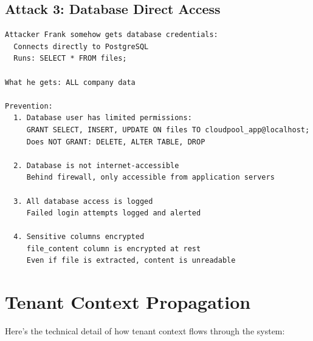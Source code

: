 \documentclass[11pt,a4paper]{report}
\begin{document}
\section{Attack 3: Database Direct Access}


\begin{lstlisting}[language=text]
Attacker Frank somehow gets database credentials:
  Connects directly to PostgreSQL
  Runs: SELECT * FROM files;

What he gets: ALL company data

Prevention:
  1. Database user has limited permissions:
     GRANT SELECT, INSERT, UPDATE ON files TO cloudpool_app@localhost;
     Does NOT GRANT: DELETE, ALTER TABLE, DROP
  
  2. Database is not internet-accessible
     Behind firewall, only accessible from application servers
  
  3. All database access is logged
     Failed login attempts logged and alerted
  
  4. Sensitive columns encrypted
     file_content column is encrypted at rest
     Even if file is extracted, content is unreadable
\end{lstlisting}


\chapter{Tenant Context Propagation}


Here's the technical detail of how tenant context flows through the system:
\end{document}
